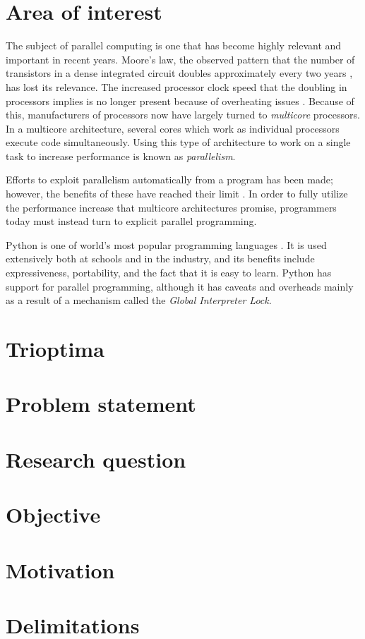 \section{Area of interest}
The subject of parallel computing is one that has become highly relevant and important in recent years.
Moore's law, the observed pattern that the number of transistors in a dense integrated circuit doubles approximately every two
years \cite{moore_1998_cramming_cmcoic},
has lost its relevance. The increased processor clock speed that the doubling in processors implies is no longer present because of
overheating issues \cite[Ch. 1]{herlihy_2012_art_taomprr}. Because of this, manufacturers of processors now have
largely turned to \emph{multicore} processors. In a multicore architecture, several cores which work as individual processors execute
code simultaneously. Using this type of architecture to work on a single task to increase performance is known as \emph{parallelism}.

Efforts to exploit parallelism automatically from a program has been made; however, the benefits of these have reached their
limit \cite{mccool_2012_structured_spppfec}. In order to fully utilize the performance increase that multicore architectures promise, 
programmers today must instead turn to explicit parallel programming.

Python is one of world's most popular programming languages \cite{krill_2015_python_psnhilp}. It is used extensively both at schools and
in the industry, and its benefits include expressiveness, portability, and the fact that it is easy to learn. Python has support for
parallel programming, although it has caveats and overheads mainly as a result of a mechanism called the \emph{Global Interpreter Lock}.

\section{Trioptima}

\section{Problem statement}

\section{Research question}

\section{Objective}

\section{Motivation}

\section{Delimitations}

